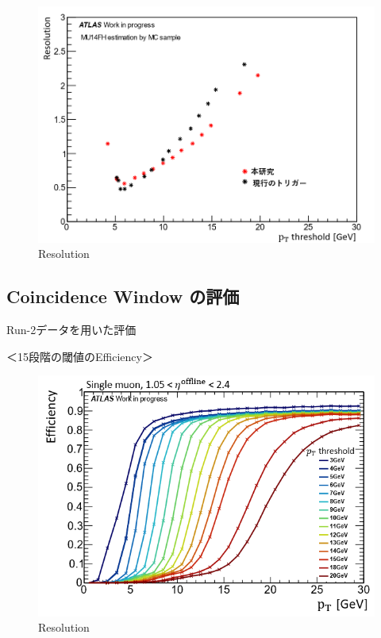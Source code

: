 \begin{figure}[tb]
  \centering
  \includegraphics[clip, width=14cm]{fig/4/resolution_v07_v05.png}
  \caption{Resolution}
  \label{fig:Resolution}
\end{figure}



\subsection{Coincidence Window の評価}
Run-2データを用いた評価

＜15段階の閾値のEfficiency＞
\begin{figure}[tb]
  \centering
  \includegraphics[clip, width=14cm]{fig/4/v07_15_Eff.png}
  \caption{Resolution}
  \label{fig:Resolution}
\end{figure}


